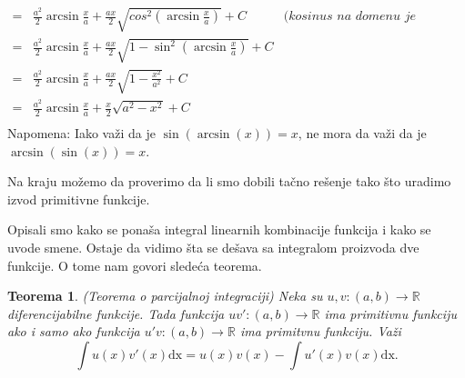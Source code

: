 \documentclass{article}
\newtheorem{teorema}{Teorema}[section]
\begin{document}
\begin{primbox}
\begin{align*}
        = & \frac{a^2}{2}\arcsin\frac{x}{a} + \frac{a x}{2}\sqrt{cos^2\left(\arcsin\frac{x}{a}\right)} + C                            & \textit{(kosinus na domenu je pozitivan)}           \\
        = & \frac{a^2}{2}\arcsin\frac{x}{a} + \frac{a x}{2}\sqrt{1-\sin^2\left(\arcsin\frac{x}{a}\right)} + C                         &                                                     \\
        = & \frac{a^2}{2}\arcsin\frac{x}{a} + \frac{a x}{2}\sqrt{1-\frac{x^2}{a^2}} + C                                               &                                                     \\
        = & \frac{a^2}{2}\arcsin\frac{x}{a} + \frac{x}{2}\sqrt{a^2-x^2} + C                                                           &                                                     \\
    \end{align*}
    \label{napomena_1_primer_1.9}Napomena: Iako važi da je $\sin\left(\arcsin\left(x\right)\right)=x$, ne mora da važi da je $\arcsin\left(\sin\left(x\right)\right)=x$.\par
    Na kraju možemo da proverimo da li smo dobili tačno rešenje tako što uradimo izvod primitivne funkcije.
\end{primbox}

Opisali smo kako se ponaša integral linearnih kombinacije funkcija i kako se uvode smene. Ostaje da vidimo
šta se dešava sa integralom proizvoda dve funkcije. O tome nam govori sledeća teorema.

\begin{teoremabox}
    \label{teorema_1.4}
    \begin{teorema}
        (Teorema o parcijalnoj integraciji) Neka su
        $u, v: \left(a, b\right) \longrightarrow \mathbb{R}$ diferencijabilne
        funkcije. Tada funkcija $u v':\left(a, b\right) \longrightarrow \mathbb{R}$
        ima primitivnu funkciju ako i samo ako funkcija $u' v: \left(a, b\right) \longrightarrow \mathbb{R}$
        ima primitvnu funkciju. Važi
        $$\int u\left(x\right)v'\left(x\right)\text{dx} = u\left(x\right)v\left(x\right) -\int u'\left(x\right)v\left(x\right)\text{dx}.$$
    \end{teorema}
\end{teoremabox}
\end{document}
